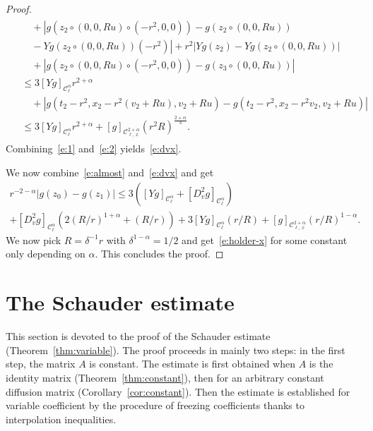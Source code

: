 \documentclass[AHL,Unicode,longabstracts,published]{cedram}
\newcommand{\cC}{\mathcal{C}}
\begin{document}
\begin{proof}
\begin{multline}
\begin{aligned}
&\quad + \left|g\left(z_2 \circ (0,0,Ru) \circ (-r^2,0,0)\right) - g\left(z_2 \circ (0,0,Ru)\right)\right.\\
&\left.\quad - Yg \left(z_2 \circ (0,0,Ru)\right)(-r^2) \right| + r^2 \left|Yg (z_2) - Yg \left(z_2 \circ (0,0,Ru)\right)\right| \\
&\quad + \left| g \left(z_2 \circ (0,0,Ru) \circ (-r^2, 0,0)\right) - g\left(z_3 \circ (0,0,Ru)\right)\right|\\
& \le 3 [Yg]_{\cC^\alpha_\ell } r^{2+\alpha} \\
&\quad + \left| g\left(t_2 -r^2,x_2 -r^2 (v_2 + Ru), v_2 + Ru\right) - g\left(t_2-r^2, x_2 -r^2 v_2, v_2 + Ru\right) \right|\\
& \le 3 [Yg]_{\cC^\alpha_\ell} r^{2+\alpha} + [g]_{\cC^{2+\alpha}_{\ell,\,x}} (r^2 R)^{\frac{2+\alpha}3}.
\end{aligned}
\end{multline}
Combining~\eqref{e:1} and~\eqref{e:2} yields~\eqref{e:dvx}.

We now combine~\eqref{e:almost} and~\eqref{e:dvx} and get
\begin{multline*}
r^{-2-\alpha}\left|g(z_0)-g(z_1)\right| \le 3\left([Yg]_{\cC^\alpha_\ell} + \left[D^2_v g\right]_{\cC^\alpha_\ell}\right) \\
+ \left[D^2_v g\right]_{\cC^\alpha_\ell} \left(2 (R/r)^{1+\alpha} + (R/r)\right)
+ 3 [Yg]_{\cC^\alpha_\ell} (r/R) + [g]_{\cC^{2+\alpha}_{\ell,\,x}} (r/R)^{1-\alpha}.
\end{multline*}
We now pick $R = \delta^{-1} r$ with $\delta^{1-\alpha} = 1/2$ and get~\eqref{e:holder-x} for some constant only depending on $\alpha$. This concludes the proof.
\end{proof}


\section{The Schauder estimate}\label{sec:schauder}

This section is devoted to the proof of the Schauder estimate (Theorem~\ref{thm:variable}). The proof proceeds in mainly two steps: in the first step, the matrix $A$ is constant. The estimate is first obtained when $A$ is the identity matrix (Theorem~\ref{thm:constant}), then for an arbitrary constant diffusion matrix (Corollary~\ref{cor:constant}). Then the estimate is established for variable coefficient by the procedure of freezing coefficients thanks to interpolation inequalities.
\end{document}
